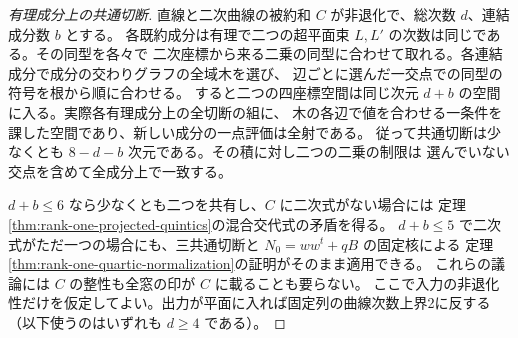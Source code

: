 \begin{proof}[有理成分上の共通切断]
直線と二次曲線の被約和 $C$ が非退化で、総次数 $d$、連結成分数 $b$ とする。
各既約成分は有理で二つの超平面束 $L,L'$ の次数は同じである。その同型を各々で
二次座標から来る二乗の同型に合わせて取れる。各連結成分で成分の交わりグラフの全域木を選び、
辺ごとに選んだ一交点での同型の符号を根から順に合わせる。
すると二つの四座標空間は同じ次元 $d+b$ の空間に入る。実際各有理成分上の全切断の組に、
木の各辺で値を合わせる一条件を課した空間であり、新しい成分の一点評価は全射である。
従って共通切断は少なくとも $8-d-b$ 次元である。その積に対し二つの二乗の制限は
選んでいない交点を含めて全成分上で一致する。

$d+b\le6$ なら少なくとも二つを共有し、$C$ に二次式がない場合には
定理\ref{thm:rank-one-projected-quintics}の混合交代式の矛盾を得る。
$d+b\le5$ で二次式がただ一つの場合にも、三共通切断と $N_0=ww^t+qB$ の固定核による
定理\ref{thm:rank-one-quartic-normalization}の証明がそのまま適用できる。
これらの議論には $C$ の整性も全窓の印が $C$ に載ることも要らない。
ここで入力の非退化性だけを仮定してよい。出力が平面に入れば固定列の曲線次数上界2に反する
（以下使うのはいずれも $d\ge4$ である）。
\end{proof}
